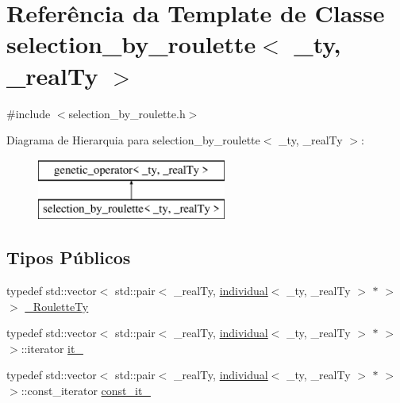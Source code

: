 \hypertarget{classselection__by__roulette}{
\section{Referência da Template de Classe selection\_\-by\_\-roulette$<$ \_\-ty, \_\-realTy $>$}
\label{classselection__by__roulette}
}


{\ttfamily \#include $<$selection\_\-by\_\-roulette.h$>$}

Diagrama de Hierarquia para selection\_\-by\_\-roulette$<$ \_\-ty, \_\-realTy $>$:\begin{figure}[H]
\begin{center}
\leavevmode
\includegraphics[height=2cm]{classselection__by__roulette}
\end{center}
\end{figure}
\subsection*{Tipos Públicos}
\begin{DoxyCompactItemize}
\item 
typedef std::vector$<$ std::pair$<$ \_\-realTy, \hyperlink{classindividual}{individual}$<$ \_\-ty, \_\-realTy $>$ $\ast$ $>$ $>$ \hyperlink{classselection__by__roulette_a4c224a095113f38dce7d98f10d8c0833}{\_\-RouletteTy}
\item 
typedef std::vector$<$ std::pair$<$ \_\-realTy, \hyperlink{classindividual}{individual}$<$ \_\-ty, \_\-realTy $>$ $\ast$ $>$ $>$::iterator \hyperlink{classselection__by__roulette_a557d2432eb36aba61aa31a9e4b0dcb54}{it\_\-}
\item 
typedef std::vector$<$ std::pair$<$ \_\-realTy, \hyperlink{classindividual}{individual}$<$ \_\-ty, \_\-realTy $>$ $\ast$ $>$ $>$::const\_\-iterator \hyperlink{classselection__by__roulette_ac64df0d86cf8396ce91df17d9ce27f0e}{const\_\-it\_\-}
\end{DoxyCompactItemize}
